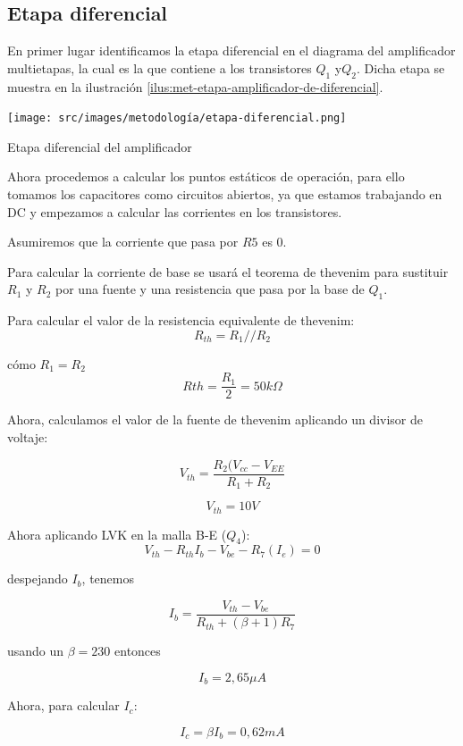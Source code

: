 \subsection{Etapa diferencial} 

En primer lugar identificamos la etapa diferencial en el diagrama del amplificador multietapas, la cual es la que contiene a los transistores $Q_1$ y$Q_2$. Dicha etapa se muestra en la ilustración \ref{ilus:met-etapa-amplificador-de-diferencial}.

\begin{ilustracion}[ht]
    \centering
    \texttt{[image: src/images/metodología/etapa-diferencial.png]}
    \caption{Etapa diferencial del amplificador}
    \label{ilus:met-etapa-amplificador-de-diferencial}
\end{ilustracion}

Ahora procedemos a calcular los puntos estáticos de operación, para ello tomamos los capacitores como circuitos abiertos, ya que estamos trabajando en DC y empezamos a calcular las corrientes en los transistores.

Asumiremos que la corriente que pasa por $R5$ es 0.

Para calcular la corriente de base se usará el teorema de thevenim para sustituir $R_1$ y $R_2$ por una fuente y una resistencia que pasa por la base de $Q_1$.

Para calcular el valor de la resistencia equivalente de thevenim:
$$R_{th} = R_1 // R_2$$

cómo $R_1 = R_2$
$$Rth = \frac{R_1}{2} = 50k \Omega$$

Ahora, calculamos el valor de la fuente de thevenim aplicando un divisor de voltaje:

$$V_{th} = \frac{R_2 ( V_{cc} - V_{EE}}{R_1 + R_2}$$

$$V_{th} = 10 V$$

Ahora aplicando LVK en la malla B-E ($Q_4$):
\begin{equation*}
V_{th} - R_{th}I_b - V_{be} - R_7(I_e) = 0
\end{equation*}

despejando $I_b$, tenemos

$$I_b = \frac{V_{th} - V_{be}}{R_{th} + (\beta + 1) R_7}$$

usando un $\beta = 230$ entonces

$$I_{b} = 2,65\mu A$$

Ahora, para calcular $I_c$:

$$I_{c} = \beta I_b = 0,62mA$$

